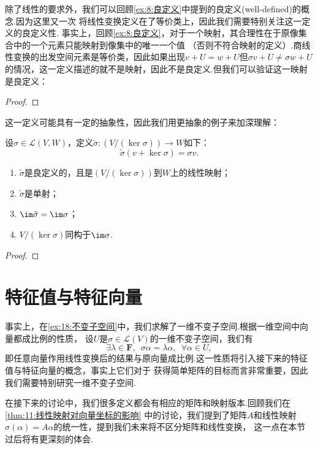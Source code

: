 除了线性的要求外，我们可以回顾\autoref{ex:8:良定义}中提到的良定义(well-defined)的概念.因为这里又一次
将线性变换定义在了等价类上，因此我们需要特别关注这一定义的良定义性.
事实上，回顾\autoref{ex:8:良定义}，对于一个映射，其合理性在于原像集合中的一个元素只能映射到像集中的唯一一个值
（否则不符合映射的定义）.商线性变换的出发空间元素是等价类，因此如果出现$v+U=w+U$但$\sigma v+U\neq \sigma w+U$
的情况，这一定义描述的就不是映射，因此不是良定义.但我们可以验证这一映射是良定义：

\begin{proof}
    
\end{proof}

这一定义可能具有一定的抽象性，因此我们用更抽象的例子来加深理解：
\begin{example}
    设$\sigma\in \mathcal{L}(V,W)$，定义$\tilde{\sigma}:(V/(\ker \sigma))\to W$如下：
    \[\tilde{\sigma}(v+\ker\sigma)=\sigma v.\]
    \begin{enumerate}[label=(\arabic*)]
        \item $\tilde{\sigma}$是良定义的，且是$(V/(\ker \sigma))$到$W$上的线性映射；

        \item $\tilde{\sigma}$是单射；

        \item $\im \tilde{\sigma}=\im \sigma$；

        \item $V/(\ker \sigma)$同构于$\im \sigma$.
    \end{enumerate}
\end{example}
\begin{proof}
    
\end{proof}

\section{特征值与特征向量}
事实上，在\autoref{ex:18:不变子空间}中，我们求解了一维不变子空间.根据一维空间中向量都成比例的性质，
设$U$是$\sigma\in\mathcal{L}(V)$的一维不变子空间，我们有
\[\exists\lambda\in\mathbf{F},\enspace\sigma\alpha=\lambda\alpha,\enspace\forall \alpha\in U,\]
即任意向量作用线性变换后的结果与原向量成比例.这一性质将引入接下来的特征值与特征向量的概念，事实上它们对于
获得简单矩阵的目标而言非常重要，因此我们需要特别研究一维不变子空间.

在接下来的讨论中，我们很多定义都会有相应的矩阵和映射版本.回顾我们在\autoref{thm:11:线性映射对向量坐标的影响}
中的讨论，我们提到了矩阵$A$和线性映射$\sigma(\alpha)=A\alpha$的统一性，提到我们未来将不区分矩阵和线性变换，
这一点在本节过后将有更深刻的体会.


